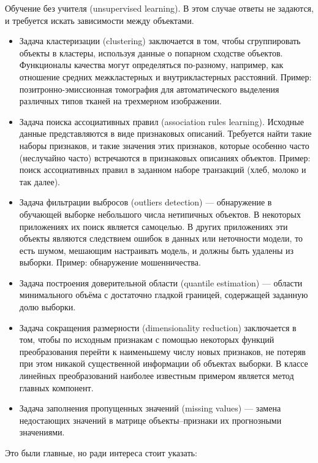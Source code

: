 \documentclass[a4paper, 12pt]{article}
\begin{document}
	Обучение без учителя (unsupervised learning). В этом случае ответы не задаются, и требуется искать зависимости между объектами.
	\begin{itemize}
		\item Задача кластеризации (clustering) заключается в том, чтобы сгруппировать объекты в кластеры, используя данные о попарном сходстве объектов. Функционалы качества могут определяться по-разному, например, как отношение средних межкластерных и внутрикластерных расстояний. Пример: позитронно-эмиссионная томография для автоматического выделения различных типов тканей на трехмерном изображении.
		
		\item Задача поиска ассоциативных правил (association rules learning). Исходные данные представляются в виде признаковых описаний. Требуется найти такие наборы признаков, и такие значения этих признаков, которые особенно часто (неслучайно часто) встречаются в признаковых описаниях объектов. Пример: поиск ассоциативных правил в заданном наборе транзакций (хлеб, молоко и так далее).
		
		\item Задача фильтрации выбросов (outliers detection) — обнаружение в обучающей выборке небольшого числа нетипичных объектов. В некоторых приложениях их поиск является самоцелью. В других приложениях эти объекты являются следствием ошибок в данных или неточности модели, то есть шумом, мешающим настраивать модель, и должны быть удалены из выборки. Пример: обнаружение мошенничества.
		
		\item Задача построения доверительной области (quantile estimation) — области минимального объёма с достаточно гладкой границей, содержащей заданную долю выборки.
		
		\item Задача сокращения размерности (dimensionality reduction) заключается в том, чтобы по исходным признакам с помощью некоторых функций преобразования перейти к наименьшему числу новых признаков, не потеряв при этом никакой существенной информации об объектах выборки. В классе линейных преобразований наиболее известным примером является метод главных компонент.
		
		\item Задача заполнения пропущенных значений (missing values) — замена недостающих значений в матрице объекты–признаки их прогнозными значениями.
	\end{itemize}
	
	Это были главные, но ради интереса стоит указать:
	
\end{document}
